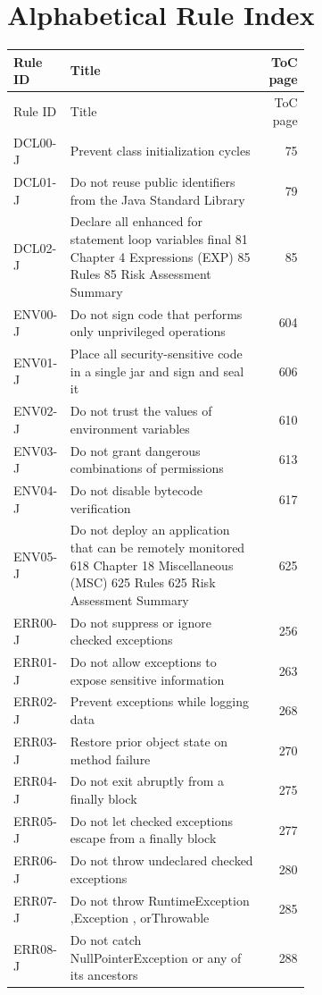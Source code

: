 \documentclass[11pt]{report}
\begin{document}
\chapter{Alphabetical Rule Index}
\begin{longtable}{@{}l>{\raggedright\arraybackslash}p{0.66\linewidth}r@{}}
\toprule
Rule ID & Title & ToC page\\
\midrule
\endfirsthead
\toprule
Rule ID & Title & ToC page\\
\midrule
\endhead
\bottomrule
\endfoot
DCL00-J & Prevent class initialization cycles & 75\\
DCL01-J & Do not reuse public identifiers from the Java Standard Library & 79\\
DCL02-J & Declare all enhanced for statement loop variables final 81 Chapter 4 Expressions (EXP) 85 Rules 85 Risk Assessment Summary & 85\\
ENV00-J & Do not sign code that performs only unprivileged operations & 604\\
ENV01-J & Place all security-sensitive code in a single jar and sign and seal it & 606\\
ENV02-J & Do not trust the values of environment variables & 610\\
ENV03-J & Do not grant dangerous combinations of permissions & 613\\
ENV04-J & Do not disable bytecode verification & 617\\
ENV05-J & Do not deploy an application that can be remotely monitored 618 Chapter 18 Miscellaneous (MSC) 625 Rules 625 Risk Assessment Summary & 625\\
ERR00-J & Do not suppress or ignore checked exceptions & 256\\
ERR01-J & Do not allow exceptions to expose sensitive information & 263\\
ERR02-J & Prevent exceptions while logging data & 268\\
ERR03-J & Restore prior object state on method failure & 270\\
ERR04-J & Do not exit abruptly from a finally block & 275\\
ERR05-J & Do not let checked exceptions escape from a finally block & 277\\
ERR06-J & Do not throw undeclared checked exceptions & 280\\
ERR07-J & Do not throw RuntimeException ,Exception , orThrowable & 285\\
ERR08-J & Do not catch NullPointerException or any of its ancestors & 288\\

\end{longtable}
\end{document}
